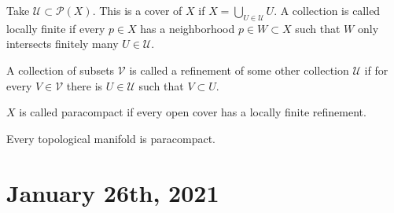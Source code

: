 \documentclass[12pt]{scrartcl}
\let \mc \mathcal
\begin{document}
\begin{definition} Take $\mc U \subset \mc P(X)$.  This is a cover of $X$ if $X = \bigcup_{U \in \mc U} U$.  A collection is called locally finite if every $p \in X$ has a neighborhood $p \in W \subset X$ such that $W$ only intersects finitely many $U \in \mc U$.    
\end{definition}

\begin{definition} A collection of subsets $\mc V$ is called a refinement of some other collection $\mc U$ if for every $V \in \mc V$ there is $U \in \mc U$ such that $V \subset U$.  
\end{definition}

\begin{definition} $X$ is called paracompact if every open cover has a locally finite refinement. 
\end{definition}
\begin{thm} Every topological manifold is paracompact.  
\end{thm}
\pagebreak
\section{January 26th, 2021}
\end{document}
